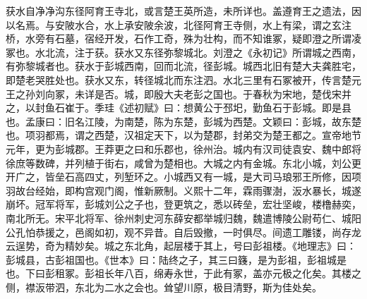 \documentclass[12pt,UTF8]{ctexbook}
\begin{document}
获水自净净沟东径阿育王寺北，或言楚王英所造，未所详也。盖遵育王之遗法，因以名焉。与安陂水合，水上承安陂余波，北径阿育王寺侧，水上有梁，谓之玄注桥，水旁有石墓，宿经开发，石作工奇，殊为壮构，而不知谁冢，疑即澄之所谓凌冢也。水北流，注于获。获水又东径弥黎城北。刘澄之《永初记》所谓城之西南，有弥黎城者也。获水于彭城西南，回而北流，径彭城。城西北旧有楚大夫龚胜宅，即楚老哭胜处也。获水又东，转径城北而东注泗。水北三里有石冢被开，传言楚元王之孙刘向冢，未详是否。城，即殷大夫老彭之国也。于春秋为宋地，楚伐宋并之，以封鱼石崔于。季珪《述初赋》曰：想黄公于邳圯，勤鱼石于彭城。即是县也。孟康曰：旧名江陵，为南楚，陈为东楚，彭城为西楚。文颖曰：彭城，故东楚也。项羽都焉，谓之西楚，汉祖定天下，以为楚郡，封弟交为楚王都之。宣帝地节元年，更为彭城郡。王莽更之曰和乐郡也，徐州治。城内有汉司徒袁安、魏中郎将徐庶等数碑，并列植于街右，咸曾为楚相也。大城之内有金城。东北小城，刘公更开广之，皆垒石高四丈，列堑环之。小城西又有一城，是大司马琅邪王所修，因项羽故台经始，即构宫观门阁，惟新厥制。义熙十二年，霖雨骤澍，汳水暴长，城遂崩坏。冠军将军，彭城刘公之子也，登更筑之，悉以砖垒，宏壮坚峻，楼橹赫奕，南北所无。宋平北将军、徐州刺史河东薛安都举城归魏，魏遣博陵公尉苟仁、城阳公孔怕恭援之，邑阁如初，观不异昔。自后毁撤，一时俱尽。间遗工雕镂，尚存龙云逞势，奇为精妙矣。城之东北角，起层楼于其上，号曰彭祖楼。《地理志》曰：彭城县，古彭祖国也。《世本》曰：陆终之子，其三曰籛，是为彭祖，彭祖城是也。下曰彭租冢。彭祖长年八百，绵寿永世，于此有冢，盖亦元极之化矣。其楼之侧，襟汳带泗，东北为二水之会也。耸望川原，极目清野，斯为佳处矣。
\end{document}
